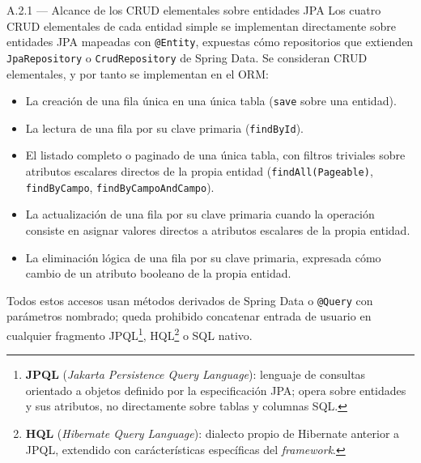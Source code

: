 \documentclass[11pt,a4paper]{article}
\begin{document}
\begin{cajarepo}{A.2.1 --- Alcance de los CRUD elementales sobre entidades JPA}
    Los cuatro CRUD elementales de cada entidad simple se implementan directamente sobre entidades JPA mapeadas con \texttt{@Entity}, expuestas c\'{o}mo repositorios que extienden \texttt{JpaRepository} o \texttt{CrudRepository} de Spring Data. Se consideran CRUD elementales, y por tanto se implementan en el ORM:
    \begin{itemize}
        \item La creaci\'{o}n de una fila \'{u}nica en una \'{u}nica tabla (\texttt{save} sobre una entidad).
        \item La lectura de una fila por su clave primaria (\texttt{findById}).
        \item El listado completo o paginado de una \'{u}nica tabla, con filtros triviales sobre atributos escalares directos de la propia entidad (\texttt{findAll(Pageable)}, \texttt{findByCampo}, \texttt{findByCampoAndCampo}).
        \item La actualizaci\'{o}n de una fila por su clave primaria cuando la operaci\'{o}n consiste en asignar valores directos a atributos escalares de la propia entidad.
        \item La eliminaci\'{o}n l\'{o}gica de una fila por su clave primaria, expresada c\'{o}mo cambio de un atributo booleano de la propia entidad.
    \end{itemize}
    Todos estos accesos usan m\'{e}todos derivados de Spring Data o \texttt{@Query} con par\'{a}metros nombrado; queda prohibido concatenar entrada de usuario en cualquier fragmento JPQL\footnote{\textbf{JPQL} (\emph{Jakarta Persistence Query Language}): lenguaje de consultas orientado a objetos definido por la especificaci\'{o}n JPA; opera sobre entidades y sus atributos, no directamente sobre tablas y columnas SQL.}, HQL\footnote{\textbf{HQL} (\emph{Hibernate Query Language}): dialecto propio de Hibernate anterior a JPQL, extendido con car\'{a}cter\'{i}sticas espec\'{i}ficas del \emph{framework}.} o SQL nativo.
\end{cajarepo}
\end{document}
